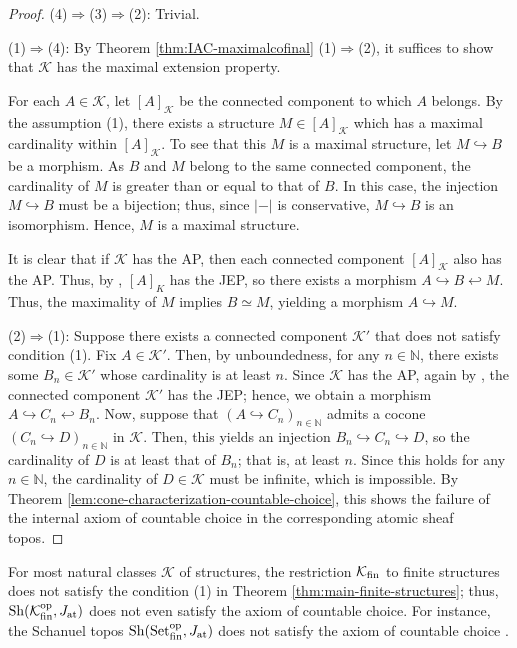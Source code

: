 \documentclass[10pt]{amsart}
\numberwithin{equation}{section}
\theoremstyle{plain}
\theoremstyle{definition}
\newcommand{\N}{\mathbb{N}}
\newcommand{\K}{\mathcal{K}}
\newcommand{\embed}{\hookrightarrow}
\newcommand{\leftembed}{\hookleftarrow}
\begin{document}
\begin{proof}
(4)$\Rightarrow$(3)$\Rightarrow$(2):
Trivial.

(1)$\Rightarrow$(4):
By Theorem \ref{thm:IAC-maximalcofinal} (1)$\Rightarrow$(2), it suffices to show that $\K$ has the maximal extension property.

For each $A\in\K$, let $[A]_\K$ be the connected component to which $A$ belongs.
By the assumption (1), there exists a structure $M\in [A]_\K$ which has a maximal cardinality within $[A]_\K$.
To see that this $M$ is a maximal structure, let $M\hookrightarrow B$ be a morphism.
As $B$ and $M$ belong to the same connected component, the cardinality of $M$ is greater than or equal to that of $B$.
In this case, the injection $M\hookrightarrow B$ must be a bijection; thus, since $|-|$ is conservative, $M\hookrightarrow B$ is an isomorphism.
Hence, $M$ is a maximal structure.

It is clear that if $\K$ has the AP, then each connected component $[A]_\K$ also has the AP.
Thus, by \cite[Lemma 3.7]{Car14}, $[A]_K$ has the JEP, so there exists a morphism $A\embed B\leftembed M$.
Thus, the maximality of $M$ implies $B\simeq M$, yielding a morphism $A\embed M$.


(2)$\Rightarrow$(1):
Suppose there exists a connected component $\K'$ that does not satisfy condition (1).
Fix $A\in\K'$.
Then, by unboundedness, for any $n\in\N$, there exists some $B_n\in\K'$ whose cardinality  is at least $n$.
Since $\K$ has the AP, again by \cite[Lemma 3.7]{Car14}, the connected component $\K'$ has the JEP; hence, we obtain a morphism $A\embed C_n\leftembed B_n$.
Now, suppose that $(A\embed C_n)_{n\in\N}$ admits a cocone $(C_n\embed D)_{n\in\N}$ in $\K$.
Then, this yields an injection $B_n\embed C_n\embed D$, so the cardinality of $D$ is at least that of $B_n$; that is, at least $n$.
Since this holds for any $n\in\N$, the cardinality of $D\in\K$ must be infinite, which is impossible.
By Theorem \ref{lem:cone-characterization-countable-choice}, this shows the failure of the internal axiom of countable choice in the corresponding atomic sheaf topos.
\end{proof}

For most natural classes $\K$ of structures, the restriction $\K_{\rm fin}$ to finite structures does not satisfy the condition (1) in Theorem \ref{thm:main-finite-structures}; thus, ${\rm Sh}(\K_{\rm fin}^{\rm op},J_{\rm at})$ does not even satisfy the axiom of countable choice.
For instance, the Schanuel topos ${\rm Sh}({\rm Set}_{\rm fin}^{\rm op},J_{\rm at})$ does not satisfy the axiom of countable choice \cite{SGL,Mej19}.
\end{document}
